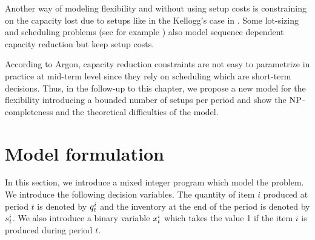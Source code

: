 \medskip


Another way of modeling flexibility and without using setup costs is constraining on the capacity lost due to setups like in the Kellogg's case in \cite[Chapter 4]{Pochet2006}. Some lot-sizing and scheduling problems (see for example \cite{Guimaraes2014}) also model sequence dependent capacity reduction but keep setup costs.



\medskip


According to Argon, capacity reduction constraints are not easy to parametrize in practice at mid-term level since they rely on scheduling which are short-term decisions. Thus, in the follow-up to this chapter, we propose a new model for the flexibility introducing a bounded number of setups per period and show the $\operatorname{NP}$-completeness and the theoretical difficulties of the model.


\section{Model formulation}
\label{sec:PDP:deterministic:model}


In this section, we introduce a mixed integer program which model the problem.
We introduce the following decision variables. The quantity of item $i$ produced at period $t$ is denoted by $q_t^i$ and the inventory at the end of the period is denoted by $s_t^i$. We also introduce a binary variable $x_t^i$ which takes the value 1 if the item $i$ is produced during period $t$.

